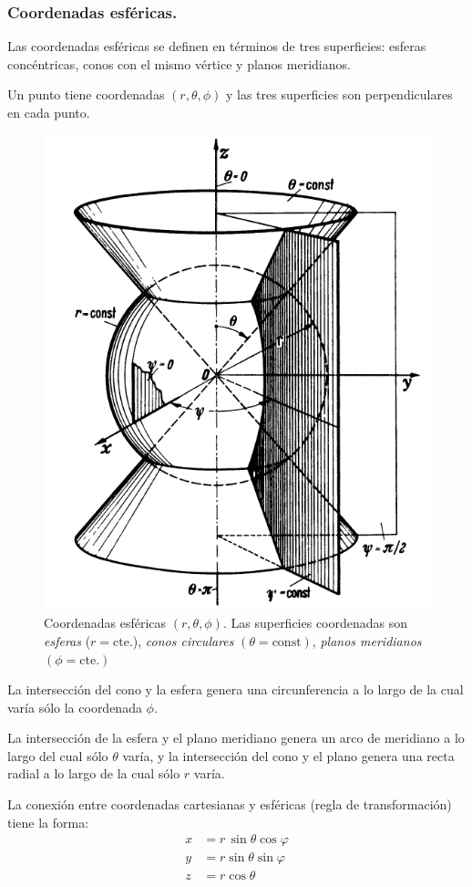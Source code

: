 \subsubsection*{Coordenadas esféricas.}

Las coordenadas esféricas se definen en términos de tres superficies: esferas concéntricas, conos con el mismo vértice y planos meridianos.
\par
Un punto tiene coordenadas $(r, \theta, \phi)$ y las tres superficies son perpendiculares en cada punto.
\begin{figure}[H]
   \centering
   \includegraphics[scale=1.5]{Imagenes/Planos_Coordenadas_Esfericas.png}
   \caption{Coordenadas esféricas $(r, \theta, \phi)$. Las superficies coordenadas son \emph{esferas} ($r = \mbox{cte.}$), \emph{conos circulares} $(\theta = \mbox{const})$, \emph{planos meridianos} $(\phi = \mbox{cte.})$}
   \label{fig:figura_planos_esfericos}
\end{figure}
La intersección del cono y la esfera genera una circunferencia a lo largo de la cual varía sólo la coordenada $\phi$.
\par
La intersección de la esfera y el plano meridiano genera un arco de meridiano a lo largo del cual sólo $\theta$ varía, y la intersección del cono y el plano genera una recta radial a lo largo de la cual sólo $r$ varía.
\par
La conexión entre coordenadas cartesianas y esféricas (regla de transformación) tiene la forma:
\begin{align*}
x &= r \, \sin \theta \cos \varphi \\
y &= r \sin \theta \sin \varphi \\
z &= r \cos \theta
\end{align*}


